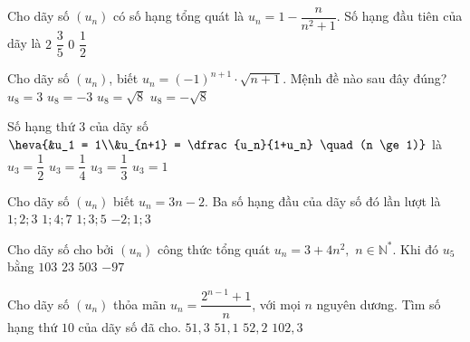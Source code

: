 \begin{ex}%
	Cho dãy số $(u_n)$ có số  hạng tổng quát là $u_n=1-\dfrac{n}{n^2+1}$. Số hạng đầu tiên của dãy là
	 \choice
		 {$2$}
		{$\dfrac{3}{5}$} 
		{$0$} 
		 {\True $\dfrac{1}{2}$}
\end{ex}

\begin{ex}%
	 Cho dãy số $(u_{n})$, biết $u_{n}=(-1)^{n+1}\cdot\sqrt{n+1}$. Mệnh đề nào sau đây đúng?
	\choice 
		 {$u_{8}=3$}
		{\True  $u_{8}=-3$}
		 {$u_{8}=\sqrt{8}$}
		 {$u_{8}=-\sqrt{8}$}
\end{ex}

\begin{ex}%
	Số hạng thứ $3$  của dãy số $\heva{&u_1 = 1\\&u_{n+1} = \dfrac{u_n}{1+u_n} \quad (n \ge 1)}$ là
	\choice 
		{$u_3=\dfrac{1}{2}$} 
		{$u_3=\dfrac{1}{4}$} 
		 {\True $u_3=\dfrac{1}{3}$}
		 {$u_3=1$}
\end{ex}

\begin{ex}%
	Cho dãy số $(u_{n})$ biết $u_{n}=3n-2$. Ba  số hạng đầu của dãy số đó lần lượt là
	 \choice
		 {$1;2;3$}
		 {\True $1;4;7$}
		{$1;3;5$} 
		 {$-2;1;3$}
\end{ex}

\begin{ex}%
	Cho dãy số cho bởi $\left(u_{n} \right)$  công thức tổng quát $u_{n} =3+4n^{2} ,\, \, n\in \mathbb{N}^{*} $. Khi đó $u_{5} $ bằng
	 \choice
		 {\True $103$}
		 {$23$}
		 {$503$}
		{$-97$} 
\end{ex}

\begin{ex}%
	Cho dãy số $(u_n)$ thỏa mãn $u_n= \dfrac{2^{n-1}+1}{n}$, với mọi $n$ nguyên dương. Tìm số hạng  thứ $10$ của dãy số đã cho.
	 \choice
		 {\True $51{,}3$}
		{$51{,}1$} 
		{$52{,} 2$} 
		 {$102{,}3$}
\end{ex}

